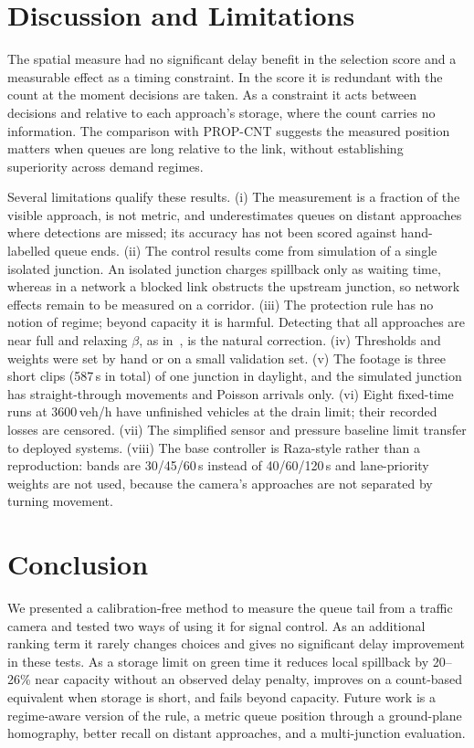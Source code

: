 \documentclass[journal]{IEEEtran}
\begin{document}
\section{Discussion and Limitations}
The spatial measure had no significant delay benefit in the selection score and a measurable effect as a
timing constraint. In the score it is redundant with the count at the moment decisions
are taken. As a constraint it acts between decisions and relative to each approach's
storage, where the count carries no information. The comparison with PROP-CNT suggests
the measured position matters when queues are long relative to the link, without establishing superiority across demand regimes.

Several limitations qualify these results. (i) The measurement is a fraction of the
visible approach, is not metric, and underestimates queues on distant approaches where
detections are missed; its accuracy has not been scored against hand-labelled queue ends.
(ii) The control results come from simulation of a single isolated junction. An isolated
junction charges spillback only as waiting time, whereas in a network a blocked link
obstructs the upstream junction, so network effects remain to be measured on a corridor. (iii) The protection rule has no
notion of regime; beyond capacity it is harmful. Detecting that all approaches are near
full and relaxing $\beta$, as in~\cite{mohajerpoor2023}, is the natural correction.
(iv) Thresholds and weights were set by hand or on a small validation set. (v) The
footage is three short clips (587\,s in total) of one junction in daylight, and the
simulated junction has straight-through movements and Poisson arrivals only. (vi) Eight fixed-time runs at 3600\,veh/h have unfinished vehicles at the drain limit; their recorded losses are censored. (vii) The simplified sensor and pressure baseline limit transfer to deployed systems. (viii) The base controller is Raza-style rather than a reproduction: bands are 30/45/60\,s instead of
40/60/120\,s and lane-priority weights are not used, because the camera's approaches are
not separated by turning movement.

\section{Conclusion}
We presented a calibration-free method to measure the queue tail from a traffic camera
and tested two ways of using it for signal control. As an additional ranking term it rarely changes choices and gives no significant delay improvement in these tests. As a
storage limit on green time it reduces local spillback by 20--26\% near capacity without an observed delay penalty, improves on a count-based equivalent when storage is short, and fails
beyond capacity. Future work is a regime-aware version of the rule, a metric queue
position through a ground-plane homography, better recall on distant approaches, and a
multi-junction evaluation.
\end{document}
